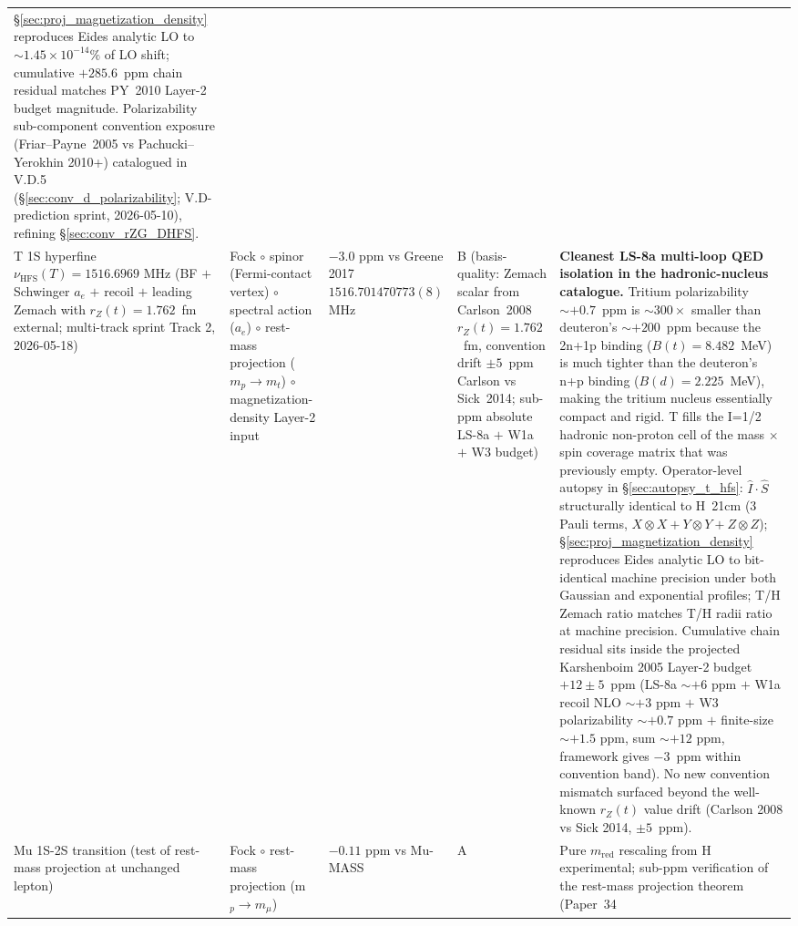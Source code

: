 \documentclass[11pt]{article}
\begin{document}
\begin{table}[h]
\begin{tabular}{p{3.8cm} p{2.5cm} p{1.5cm} p{1.4cm} p{4.5cm}}
\S\ref{sec:proj_magnetization_density} reproduces Eides analytic LO
to $\sim 1.45 \times 10^{-14}\%$ of LO shift; cumulative $+285.6$~ppm
chain residual matches PY~2010 Layer-2 budget magnitude.  Polarizability
sub-component convention exposure (Friar--Payne~2005 vs Pachucki--Yerokhin
2010+) catalogued in V.D.5 (\S\ref{sec:conv_d_polarizability}; V.D-prediction
sprint, 2026-05-10), refining \S\ref{sec:conv_rZG_DHFS}. \\
T 1S hyperfine $\nu_\text{HFS}(T) = 1516.6969$ MHz (BF $+$ Schwinger
$a_e$ $+$ recoil $+$ leading Zemach with $r_Z(t) = 1.762$~fm external;
multi-track sprint Track 2, 2026-05-18) & Fock $\circ$ spinor (Fermi-contact
vertex) $\circ$ spectral action ($a_e$) $\circ$ rest-mass projection
($m_p \to m_t$) $\circ$ magnetization-density Layer-2 input
& $-3.0$ ppm vs Greene 2017 $1516.701470773(8)$ MHz & B
(basis-quality: Zemach scalar from Carlson~2008 $r_Z(t) = 1.762$~fm,
convention drift $\pm 5$~ppm Carlson vs Sick~2014; sub-ppm absolute
LS-8a $+$ W1a $+$ W3 budget) & \textbf{Cleanest LS-8a multi-loop QED
isolation in the hadronic-nucleus catalogue.}  Tritium polarizability
$\sim +0.7$~ppm is $\sim 300\times$ smaller than deuteron's
$\sim +200$~ppm because the 2n+1p binding ($B(t) = 8.482$~MeV) is
much tighter than the deuteron's n+p binding ($B(d) = 2.225$~MeV),
making the tritium nucleus essentially compact and rigid.  T fills
the I=1/2 hadronic non-proton cell of the mass $\times$ spin coverage
matrix that was previously empty.  Operator-level autopsy in
\S\ref{sec:autopsy_t_hfs}: $\hat{I}\cdot\hat{S}$ structurally
identical to H~21cm (3 Pauli terms, $X{\otimes}X + Y{\otimes}Y +
Z{\otimes}Z$); \S\ref{sec:proj_magnetization_density} reproduces
Eides analytic LO to bit-identical machine precision under both
Gaussian and exponential profiles; T/H Zemach ratio matches T/H
radii ratio at machine precision.  Cumulative chain residual sits
inside the projected Karshenboim 2005 Layer-2 budget $+12 \pm 5$~ppm
(LS-8a $\sim$$+6$ ppm $+$ W1a recoil NLO $\sim$$+3$ ppm $+$ W3
polarizability $\sim$$+0.7$ ppm $+$ finite-size $\sim$$+1.5$ ppm,
sum $\sim$$+12$ ppm, framework gives $-3$~ppm within convention
band).  No new convention mismatch surfaced beyond the well-known
$r_Z(t)$ value drift (Carlson 2008 vs Sick 2014, $\pm 5$~ppm). \\
Mu 1S-2S transition (test of rest-mass projection at unchanged lepton)
& Fock $\circ$ rest-mass projection (m$_p \to m_\mu$) & $-0.11$ ppm vs
Mu-MASS & A & Pure $m_\text{red}$ rescaling from H experimental;
sub-ppm verification of the rest-mass projection theorem (Paper~34
$$
\end{tabular}
\end{table}
\end{document}
